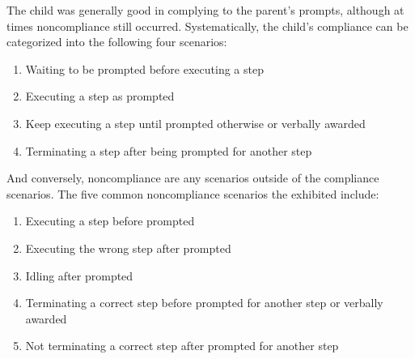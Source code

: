 The child was generally good in complying to the parent's prompts, although at times noncompliance still occurred.  Systematically, the child's compliance can be categorized into the following four scenarios:
\begin{enumerate}
	\item Waiting to be prompted before executing a step
	\item Executing a step as prompted
	\item Keep executing a step until prompted otherwise or verbally awarded
	\item Terminating a step after being prompted for another step
\end{enumerate}
And conversely, noncompliance are any scenarios outside of the compliance scenarios.  The five common noncompliance scenarios the exhibited include:
\label{List:NoncopmlianceBehaviors}
\begin{enumerate}
	\item Executing a step before prompted
	\item Executing the wrong step after prompted
	\item Idling after prompted
	\item Terminating a correct step before prompted for another step or verbally awarded
	\item Not terminating a correct step after prompted for another step
\end{enumerate}

